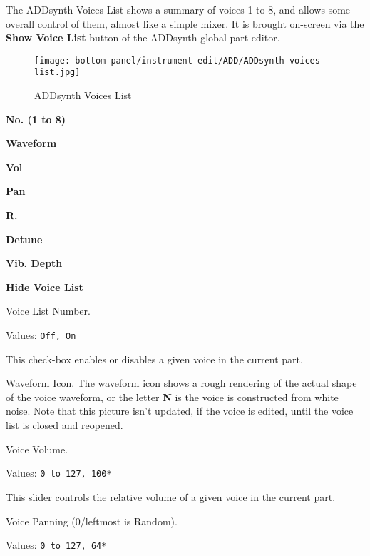    The ADDsynth Voices List shows a summary of voices 1 to 8, and allows
   some overall control of them, almost like a simple mixer.
   It is brought on-screen via the \textbf{Show Voice List} button
   of the ADDsynth global part editor.

\begin{figure}[H]
   \centering 
   \texttt{[image: bottom-panel/instrument-edit/ADD/ADDsynth-voices-list.jpg]}
   \caption{ADDsynth Voices List}
   \label{fig:addsynth_voices_list}
\end{figure}

   \begin{enumber}
      \item \textbf{No. (1 to 8)}
      \item \textbf{Waveform}
      \item \textbf{Vol}
      \item \textbf{Pan}
      \item \textbf{R.}
      \item \textbf{Detune}
      \item \textbf{Vib. Depth}
      \item \textbf{Hide Voice List}
   \end{enumber}

   \setcounter{ItemCounter}{0}      %

   Voice List Number.

   Values: \texttt{Off, On}

   This check-box enables or disables a given voice in the current part.

   Waveform Icon.
   The waveform icon shows a rough rendering of the actual shape of the
   voice waveform, or the letter \textbf{N} is the voice is constructed from
   white noise.  Note that this picture isn't updated, if the voice is
   edited, until the voice list is closed and reopened.

   Voice Volume.

   Values: \texttt{0 to 127, 100*}

   This slider controls the relative volume of a given voice in the current
   part.

   Voice Panning (0/leftmost is Random).

   Values: \texttt{0 to 127, 64*}

